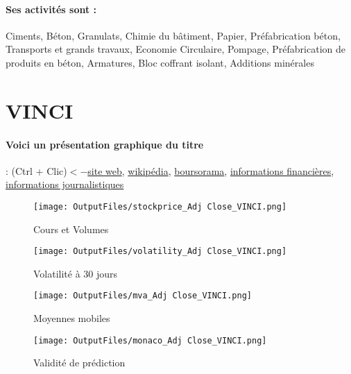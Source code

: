 \documentclass[11pt,a4paper]{report}%
\begin{document}
\paragraph{Ses activités sont : } Ciments, Béton, Granulats, Chimie du bâtiment, Papier, Préfabrication béton, Transports et grands travaux, Economie Circulaire, Pompage, Préfabrication de produits en béton, Armatures, Bloc coffrant isolant, Additions minérales 
    
    \newpage

\section{VINCI}

\paragraph{Voici un présentation graphique du titre} : (Ctrl + Clic)$<-$\href{https://www.vinci.com/vinci.nsf/fr/investisseurs.htm}{site web}, \href{https://fr.wikipedia.org/wiki/Vinci_(entreprise)}{wikipédia}, \href{https://www.boursorama.com/cours/1rPDG}{boursorama}, \href{https://www.qwant.com/?q=site:https:%2f%2fwww.easybourse.com%2faction-societe%2fVINCI&t=web&client=ext-firefox-hp}{informations financières}, \href{https://bourse.lerevenu.com/cours-de-bourse/fiche-valeur-synthese/VINCI/DG-FR}{informations journalistiques}
\begin{figure}[!htb]
   \begin{minipage}{0.5\textwidth}
     \centering
     \texttt{[image: OutputFiles/stockprice\_Adj Close\_VINCI.png]}
     \caption{Cours et Volumes}\label{Fig:price_VINCI}
   \end{minipage}\hfill
   \begin{minipage}{0.5\textwidth}
     \centering
     \texttt{[image: OutputFiles/volatility\_Adj Close\_VINCI.png]}
     \caption{Volatilité à 30 jours}\label{Fig:volat_VINCI}
   \end{minipage}
\end{figure}
\begin{figure}[!htb]
   \begin{minipage}{0.5\textwidth}
     \centering
     \texttt{[image: OutputFiles/mva\_Adj Close\_VINCI.png]}
     \caption{Moyennes mobiles}\label{Fig:mva_VINCI}
   \end{minipage}\hfill
   \begin{minipage}{0.5\textwidth}
     \centering
     \texttt{[image: OutputFiles/monaco\_Adj Close\_VINCI.png]}
     \caption{Validité de prédiction}\label{Fig:prediction_VINCI}
   \end{minipage}
\end{figure}
\end{document}
